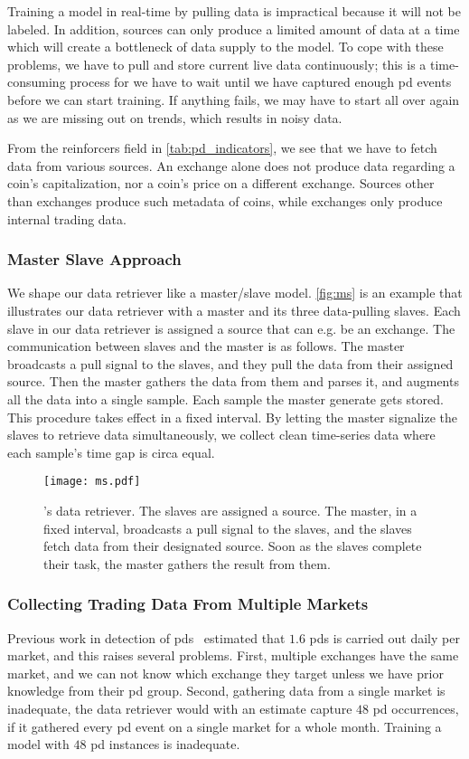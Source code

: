 Training a model in real-time by pulling data is impractical because it will not be labeled. In addition, sources can only produce a limited amount of data at a time which will create a bottleneck of data supply to the model. To cope with these problems, we have to pull and store current live data continuously; this is a time-consuming process for we have to wait until we have captured enough \ac{pd} events before we can start training. If anything fails, we may have to start all over again as we are missing out on trends, which results in noisy data.

From the reinforcers field in \autoref{tab:pd_indicators}, we see that we have to fetch data from various sources. An exchange alone does not produce data regarding a coin's capitalization, nor a coin's price on a different exchange. Sources other than exchanges produce such metadata of coins, while exchanges only produce internal trading data.

\subsubsection{Master Slave Approach}
We shape our data retriever like a master/slave model. \autoref{fig:ms} is an example that illustrates our data retriever with a master and its three data-pulling slaves. Each slave in our data retriever is assigned a source that can e.g. be an exchange. The communication between slaves and the master is as follows. The master broadcasts a pull signal to the slaves, and they pull the data from their assigned source. Then the master gathers the data from them and parses it, and augments all the data into a single sample. Each sample the master generate gets stored. This procedure takes effect in a fixed interval. By letting the master signalize the slaves to retrieve data simultaneously, we collect clean time-series data where each sample's time gap is circa equal. 

\begin{figure}[hbt!]
    \centering
    \texttt{[image: ms.pdf]}
    \caption{\project's data retriever. The slaves are assigned a source. The master, in a fixed interval, broadcasts a pull signal to the slaves, and the slaves fetch data from their designated source. Soon as the slaves complete their task, the master gathers the result from them.}
    \label{fig:ms}
\end{figure}

\subsubsection{Collecting Trading Data From Multiple Markets}
Previous work in detection of \acp{pd}~\cite{P&D_to_the_moon} estimated that $1.6$ \acp{pd} is carried out daily per market, and this raises several problems. First, multiple exchanges have the same market, and we can not know which exchange they target unless we have prior knowledge from their \ac{pd} group. Second, gathering data from a single market is inadequate, the data retriever would with an estimate capture $48$ \ac{pd} occurrences, if it gathered every \ac{pd} event on a single market for a whole month. Training a model with $48$ \ac{pd} instances is inadequate. 

